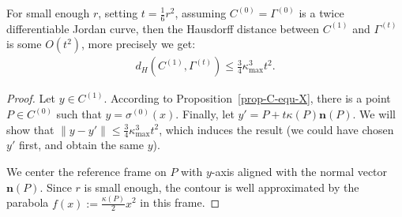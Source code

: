\documentclass[smallextended]{svjour3}
\begin{document}
\begin{proposition}\label{prop:bcf-close-to-csf}
  For small enough $r$, setting $t = \frac{1}{6}r^2$, assuming $C^{(0)}=\Gamma^{(0)}$ is a twice differentiable Jordan curve, then the Hausdorff distance between
  $C^{(1)}$ and $\Gamma^{(t)}$ is some $O(t^2)$, more precisely we get:
  \begin{align*}
    d_H( C^{(1)}, \Gamma^{(t)} ) \le \frac{3}{4} \kappa_{\max}^3 t^2.
  \end{align*}
\end{proposition}
\begin{proof}
  Let $y \in C^{(1)}$. According to Proposition~\ref{prop-C-equ-X},
  there is a point $P \in C^{(0)}$ such that
  $y=\sigma^{(0)}(x)$. Finally, let $y'=P+t\kappa(P)\mathbf{n}(P)$. We
  will show that $\| y-y' \| \le \frac{3}{4} \kappa_{\max}^3 t^2$,
  which induces the result (we could have chosen $y'$ first, and
  obtain the same $y$).

  We center the reference frame on $P$ with $y$-axis aligned with the
  normal vector $\mathbf{n}(P)$.  Since $r$ is small enough, the
  contour is well approximated by the parabola $f(x) :=
  \frac{\kappa(P)}{2}x^2$ in this frame.


\end{proof}
\end{document}
